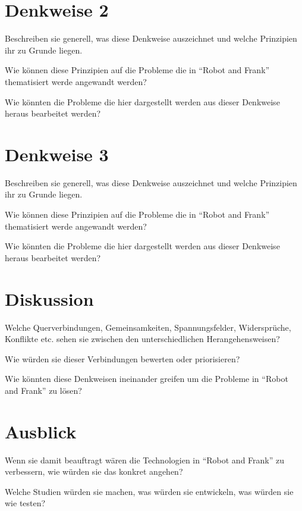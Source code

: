 \documentclass[sigchi-a, authorversion]{acmart}
\begin{document}
\section{Denkweise 2}

Beschreiben sie generell, was diese Denkweise auszeichnet und welche Prinzipien ihr zu Grunde liegen.

Wie können diese Prinzipien auf die Probleme die in ``Robot and Frank'' thematisiert werde angewandt werden?

Wie könnten die Probleme die hier dargestellt werden aus dieser Denkweise heraus bearbeitet werden?

\section{Denkweise 3}

Beschreiben sie generell, was diese Denkweise auszeichnet und welche Prinzipien ihr zu Grunde liegen.

Wie können diese Prinzipien auf die Probleme die in ``Robot and Frank'' thematisiert werde angewandt werden?

Wie könnten die Probleme die hier dargestellt werden aus dieser Denkweise heraus bearbeitet werden?


\section{Diskussion}

Welche Querverbindungen, Gemeinsamkeiten, Spannungsfelder, Widersprüche, Konflikte etc. sehen sie zwischen den unterschiedlichen Herangehensweisen?

Wie würden sie dieser Verbindungen bewerten oder priorisieren?

Wie könnten diese Denkweisen ineinander greifen um die Probleme in ``Robot and Frank'' zu lösen?

\section{Ausblick}

Wenn sie damit beauftragt wären die Technologien in ``Robot and Frank'' zu verbessern, wie würden sie das konkret angehen?

Welche Studien würden sie machen, was würden sie entwickeln, was würden sie wie testen?






\end{document}
